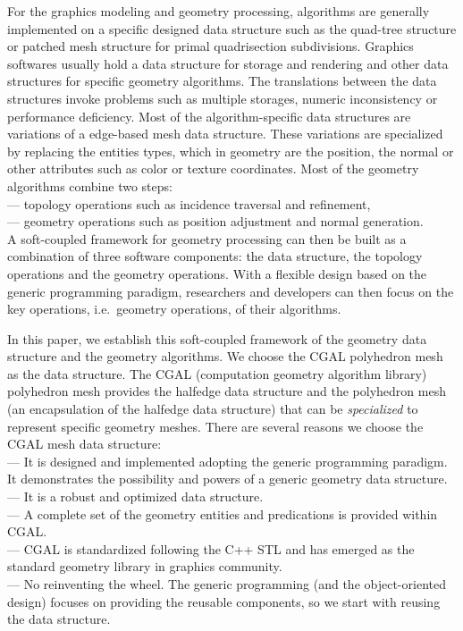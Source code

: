 For the graphics modeling and geometry 
processing, algorithms are generally implemented 
on a specific designed data structure such as
the quad-tree structure \cite{} or patched 
mesh structure \cite{} for primal quadrisection 
subdivisions. Graphics softwares usually hold a data structure
for storage and rendering and other data structures for
specific geometry algorithms. The translations between the
data structures invoke problems such as multiple storages,
numeric inconsistency or performance deficiency.
Most of the algorithm-specific data structures are
variations of a edge-based mesh data structure.
These variations are specialized by replacing the
entities types, which in geometry are the position,
the normal or other attributes such as color or texture
coordinates. Most of the geometry algorithms combine
two steps: \\
\indent --- topology operations such as incidence traversal 
and refinement,\\
\indent --- geometry operations such as position adjustment
and normal generation.\\ 
\noindent A soft-coupled framework for
geometry processing can then be built
as a combination of three software components:
the data structure, the topology operations and the 
geometry operations. With a flexible design based on
the generic programming paradigm, researchers and developers
can then focus on the key operations, i.e.\ geometry 
operations, of their algorithms.

In this paper, we establish this soft-coupled
framework of the geometry data structure and the geometry
algorithms. We choose the CGAL polyhedron mesh as the
data structure. The CGAL (computation geometry algorithm library)
polyhedron mesh provides the halfedge data structure and the
polyhedron mesh (an encapsulation of the halfedge data structure) 
that can be \emph{specialized} to represent 
specific geometry meshes. There are several reasons we
choose the CGAL mesh data structure:\\
\indent --- It is designed and implemented adopting the
generic programming paradigm. It demonstrates the possibility
and powers of a generic geometry data structure.\\
\indent --- It is a robust and optimized data structure.\\
\indent --- A complete set of the geometry entities and predications 
is provided within CGAL.\\
\indent --- CGAL is standardized following the C++ STL and has emerged
as the standard geometry library in graphics community.\\ 
\indent --- No reinventing the wheel. The generic programming
(and the object-oriented design) focuses on providing the
reusable components, so we start with reusing the data structure.

